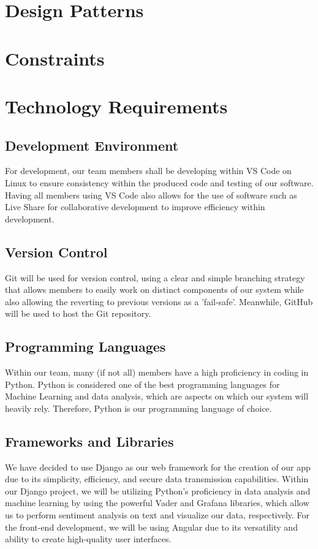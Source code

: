 \documentclass[12pt]{article}
\begin{document}
\newpage

\section{Design Patterns}

\newpage

\section{Constraints}

\newpage

\section{Technology Requirements}

\subsection{Development Environment}
For development, our team members shall be developing within VS Code on Linux to ensure consistency within the produced code and testing of our software. Having all members using VS Code also allows for the use of software such as Live Share for collaborative development to improve efficiency within development.

\subsection{Version Control}
Git will be used for version control, using a clear and simple branching strategy that allows members to easily work on distinct components of our system while also allowing the reverting to previous versions as a 'fail-safe'. Meanwhile, GitHub will be used to host the Git repository.

\subsection{Programming Languages}
Within our team, many (if not all) members have a high proficiency in coding in Python. Python is considered one of the best programming languages for Machine Learning and data analysis, which are aspects on which our system will heavily rely. Therefore, Python is our programming language of choice.

\subsection{Frameworks and Libraries}
We have decided to use Django as our web framework for the creation of our app due to its simplicity, efficiency, and secure data transmission capabilities. Within our Django project, we will be utilizing Python's proficiency in data analysis and machine learning by using the powerful Vader and Grafana libraries, which allow us to perform sentiment analysis on text and visualize our data, respectively. For the front-end development, we will be using Angular due to its versatility and ability to create high-quality user interfaces.
\end{document}
